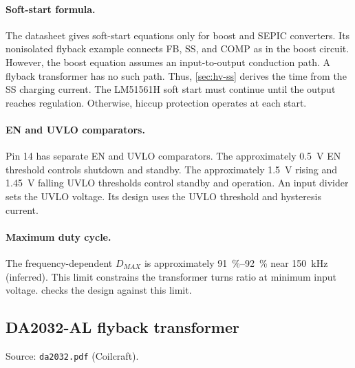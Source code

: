 \paragraph{Soft-start formula.} The datasheet gives soft-start equations only
for boost and SEPIC converters. Its nonisolated flyback example connects
FB, SS, and COMP as in the boost circuit. However, the boost equation assumes
an input-to-output conduction path. A flyback transformer has no such path.
Thus, \cref{sec:hv-ss} derives the time from the SS charging current. The
LM51561H soft start must continue until the output reaches regulation.
Otherwise, hiccup protection operates at each start.

\paragraph{EN and UVLO comparators.} Pin 14 has separate EN and UVLO
comparators. The approximately \SI{0.5}{\volt} EN threshold controls shutdown
and standby. The approximately \SI{1.5}{\volt} rising and
\SI{1.45}{\volt} falling UVLO thresholds control standby and operation. An
input divider sets the UVLO voltage. Its design uses the UVLO threshold and
hysteresis current.

\paragraph{Maximum duty cycle.} The frequency-dependent \(D_{MAX}\) is
approximately \SIrange{91}{92}{\percent} near \SI{150}{\kilo\hertz}
(inferred). This limit constrains the transformer turns ratio at minimum input
voltage.  checks the design against this limit.

\subsection{DA2032-AL flyback transformer}
\label{sec:da2032}

Source: \texttt{da2032.pdf} (Coilcraft).

